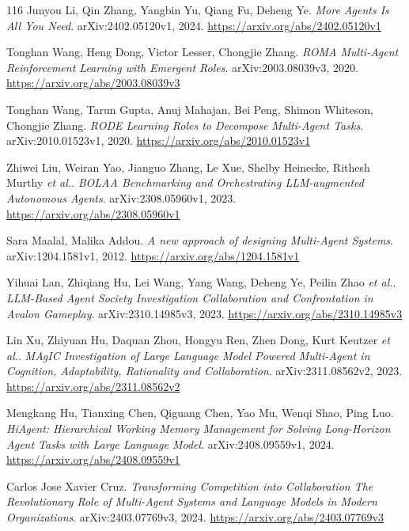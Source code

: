 \documentclass[11pt,a4paper]{article}
\begin{document}
\begin{thebibliography}{116}
Junyou Li, Qin Zhang, Yangbin Yu, Qiang Fu, Deheng Ye.
\newblock \emph{More Agents Is All You Need}.
\newblock arXiv:2402.05120v1, 2024.
\newblock \url{https://arxiv.org/abs/2402.05120v1}

Tonghan Wang, Heng Dong, Victor Lesser, Chongjie Zhang.
\newblock \emph{ROMA Multi-Agent Reinforcement Learning with Emergent Roles}.
\newblock arXiv:2003.08039v3, 2020.
\newblock \url{https://arxiv.org/abs/2003.08039v3}

Tonghan Wang, Tarun Gupta, Anuj Mahajan, Bei Peng, Shimon Whiteson, Chongjie Zhang.
\newblock \emph{RODE Learning Roles to Decompose Multi-Agent Tasks}.
\newblock arXiv:2010.01523v1, 2020.
\newblock \url{https://arxiv.org/abs/2010.01523v1}

Zhiwei Liu, Weiran Yao, Jianguo Zhang, Le Xue, Shelby Heinecke, Rithesh Murthy \emph{et al.}.
\newblock \emph{BOLAA Benchmarking and Orchestrating LLM-augmented Autonomous Agents}.
\newblock arXiv:2308.05960v1, 2023.
\newblock \url{https://arxiv.org/abs/2308.05960v1}

Sara Maalal, Malika Addou.
\newblock \emph{A new approach of designing Multi-Agent Systems}.
\newblock arXiv:1204.1581v1, 2012.
\newblock \url{https://arxiv.org/abs/1204.1581v1}

Yihuai Lan, Zhiqiang Hu, Lei Wang, Yang Wang, Deheng Ye, Peilin Zhao \emph{et al.}.
\newblock \emph{LLM-Based Agent Society Investigation Collaboration and Confrontation in Avalon Gameplay}.
\newblock arXiv:2310.14985v3, 2023.
\newblock \url{https://arxiv.org/abs/2310.14985v3}

Lin Xu, Zhiyuan Hu, Daquan Zhou, Hongyu Ren, Zhen Dong, Kurt Keutzer \emph{et al.}.
\newblock \emph{MAgIC Investigation of Large Language Model Powered Multi-Agent in Cognition, Adaptability, Rationality and Collaboration}.
\newblock arXiv:2311.08562v2, 2023.
\newblock \url{https://arxiv.org/abs/2311.08562v2}

Mengkang Hu, Tianxing Chen, Qiguang Chen, Yao Mu, Wenqi Shao, Ping Luo.
\newblock \emph{HiAgent: Hierarchical Working Memory Management for Solving Long-Horizon Agent Tasks with Large Language Model}.
\newblock arXiv:2408.09559v1, 2024.
\newblock \url{https://arxiv.org/abs/2408.09559v1}

Carlos Jose Xavier Cruz.
\newblock \emph{Transforming Competition into Collaboration The Revolutionary Role of Multi-Agent Systems and Language Models in Modern Organizations}.
\newblock arXiv:2403.07769v3, 2024.
\newblock \url{https://arxiv.org/abs/2403.07769v3}


\end{thebibliography}
\end{document}
